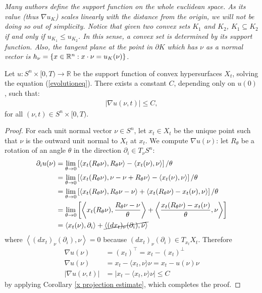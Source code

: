 \begin{oss}
	\em Many authors define the support function on the whole euclidean space. As its value (thus $\nabla u_K$) scales linearly with the distance from the origin, we will not be doing so out of simplicity. Notice that given two convex sets $K_1$ and $K_2$, $K_1 \subseteq K_2$ if and only if   $u_{K_1} \leq u_{K_2}$. In this sense, a convex set is determined by its support function. Also, the tangent plane at the point in $\partial K$ which has $\nu$ as a normal vector is  $h_\nu=\{x\in \mathbb{R}^n : x \cdot \nu = u_K (\nu)\}$. 
\end{oss}

\begin{cor}
	Let $ u : S^n \times [0, T) \to \mathbb{R} $ be the support function of convex hypersurfaces $ X_t $, solving the equation  (\ref{evolutioneq}). There exists a constant $ C $, depending only on $ u(0) $, such that:
	\begin{align*}
		|\nabla u(\nu, t)| \leq C,
	\end{align*}
	for all $ (\nu, t) \in S^n \times [0, T)$.
\end{cor}


\begin{proof} 
	For each unit normal vector $ \nu \in S^n $, let $ x_t \in X_t $ be the unique point such that $ \nu $ is the outward unit normal to $ X_t $ at $ x_t $. We compute $\nabla u(\nu)$: let $R_\theta$ be a rotation of an angle $\theta$ in the direction $\partial_i\in T_\nu S^n$:	
	\begin{align*}
		\partial_i u(\nu)  &= \lim_{\theta \rightarrow 0} \left[\langle x_t(R_\theta \nu) , R_\theta \nu\rangle - \langle x_t(\nu) ,  \nu\rangle\right]/\theta\\
		 &= \lim_{\theta \rightarrow 0} \left[\langle x_t(R_\theta \nu) , \nu - \nu + R_\theta \nu\rangle - \langle x_t(\nu) ,  \nu\rangle\right]/\theta\\
		 &= \lim_{\theta \rightarrow 0} \left[\langle x_t(R_\theta \nu) ,  R_\theta \nu - \nu\rangle + \langle  x_t(R_\theta \nu)  - x_t(\nu) ,  \nu\rangle\right]/\theta\\ 
		 &= \lim_{\theta \rightarrow 0}\left[ \left\langle x_t(R_\theta \nu) , \frac{ R_\theta \nu - \nu}{\theta}\right\rangle + \left\langle  \frac{x_t(R_\theta \nu)  - x_t(\nu)}{\theta} ,  \nu\right\rangle\right]\\
		 &= \left\langle x_t(\nu) , \partial_i\right\rangle + \cancel{\left\langle  (dx_t)_{\nu}(\partial_i),  \nu\right\rangle}
	\end{align*}
	where $\left\langle  (dx_t)_{\nu}(\partial_i),  \nu\right\rangle=0$ because $ (dx_t)_{\nu}(\partial_i) \in T_{x_t}X_t$. Therefore
	\begin{align*}
		\nabla u(\nu) &= (x_t)^\top =x_t - (x_t)^\bot \\
		\nabla u(\nu) &= x_t - \langle x_t , \nu\rangle \nu= x_t - u(\nu) \nu\\
		|\nabla u(\nu, t)| &= | x_t - \langle x_t , \nu\rangle \nu |\leq C 
	\end{align*}
	by applying Corollary \ref{x projection estimate},  which completes the proof.
\end{proof}


